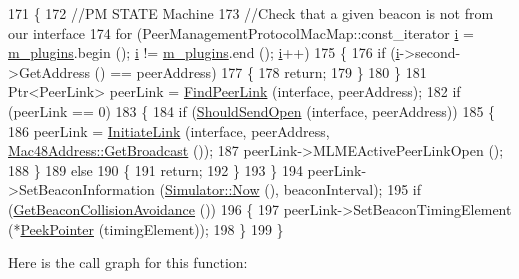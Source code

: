 \begin{DoxyCode}
171 \{
172   \textcolor{comment}{//PM STATE Machine}
173   \textcolor{comment}{//Check that a given beacon is not from our interface}
174   \textcolor{keywordflow}{for} (PeerManagementProtocolMacMap::const\_iterator \hyperlink{bernuolliDistribution_8m_a6f6ccfcf58b31cb6412107d9d5281426}{i} = \hyperlink{classns3_1_1dot11s_1_1PeerManagementProtocol_a9000d20f6feb3db279a020b237f49d64}{m\_plugins}.begin (); 
      \hyperlink{bernuolliDistribution_8m_a6f6ccfcf58b31cb6412107d9d5281426}{i} != \hyperlink{classns3_1_1dot11s_1_1PeerManagementProtocol_a9000d20f6feb3db279a020b237f49d64}{m\_plugins}.end (); \hyperlink{bernuolliDistribution_8m_a6f6ccfcf58b31cb6412107d9d5281426}{i}++)
175     \{
176       \textcolor{keywordflow}{if} (\hyperlink{bernuolliDistribution_8m_a6f6ccfcf58b31cb6412107d9d5281426}{i}->second->GetAddress () == peerAddress)
177         \{
178           \textcolor{keywordflow}{return};
179         \}
180     \}
181   Ptr<PeerLink> peerLink = \hyperlink{classns3_1_1dot11s_1_1PeerManagementProtocol_adc13cd9c290c7098d598af016b606133}{FindPeerLink} (interface, peerAddress);
182   \textcolor{keywordflow}{if} (peerLink == 0)
183     \{
184       \textcolor{keywordflow}{if} (\hyperlink{classns3_1_1dot11s_1_1PeerManagementProtocol_afb7efbd65edee4f9bbe42f0745fcc524}{ShouldSendOpen} (interface, peerAddress))
185         \{
186           peerLink = \hyperlink{classns3_1_1dot11s_1_1PeerManagementProtocol_a74fcc9fa5c9ffc741f7d89f21a246813}{InitiateLink} (interface, peerAddress, 
      \hyperlink{classns3_1_1Mac48Address_a55156e302c6bf950c0b558365adbde84}{Mac48Address::GetBroadcast} ());
187           peerLink->MLMEActivePeerLinkOpen ();
188         \}
189       \textcolor{keywordflow}{else}
190         \{
191           \textcolor{keywordflow}{return};
192         \}
193     \}
194   peerLink->SetBeaconInformation (\hyperlink{classns3_1_1Simulator_ac3178fa975b419f7875e7105be122800}{Simulator::Now} (), beaconInterval);
195   \textcolor{keywordflow}{if} (\hyperlink{classns3_1_1dot11s_1_1PeerManagementProtocol_ac97f472fcc281fb856f8434555cab024}{GetBeaconCollisionAvoidance} ())
196     \{
197       peerLink->SetBeaconTimingElement (*\hyperlink{namespacens3_af2a7557fe9afdd98d8f6f8f6e412cf5a}{PeekPointer} (timingElement));
198     \}
199 \}
\end{DoxyCode}


Here is the call graph for this function\+:


